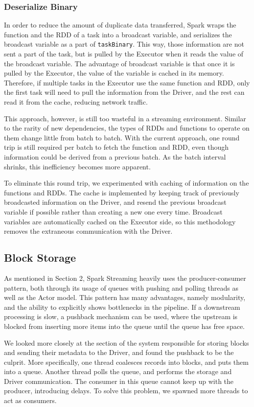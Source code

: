 \subsubsection{Deserialize Binary}
In order to reduce the amount of duplicate data transferred, Spark wraps the function and the RDD of a task into a broadcast variable, and serializes the broadcast variable as a part of \texttt{taskBinary}. This way, those information are not sent a part of the task, but is pulled by the Executor when it reads the value of the broadcast variable. The advantage of broadcast variable is that once it is pulled by the Executor, the value of the variable is cached in its memory. Therefore, if multiple tasks in the Executor use the same function and RDD, only the first task will need to pull the information from the Driver, and the rest can read it from the cache, reducing network traffic.

This approach, however, is still too wasteful in a streaming environment. Similar to the rarity of new dependencies, the types of RDDs and functions to operate on them change little from batch to batch. With the current approach, one round trip is still required per batch to fetch the function and RDD, even though information could be derived from a previous batch. As the batch interval shrinks, this inefficiency becomes more apparent.

To eliminate this round trip, we experimented with caching of information on the functions and RDDs. The cache is implemented by keeping track of previously broadcasted information on the Driver, and resend the previous broadcast variable if possible rather than creating a new one every time. Broadcast variables are automatically cached on the Executor side, so this methodology removes the extraneous communication with the Driver.

\subsection{Block Storage}
As mentioned in Section 2, Spark Streaming heavily uses the producer-consumer pattern, both through its usage of queues with pushing and polling threads as well as the Actor model. This pattern has many advantages, namely modularity, and the ability to explicitly shows bottlenecks in the pipeline. If a downstream processing is slow, a pushback mechanism can be used, where the upstream is blocked from inserting more items into the queue until the queue has free space.

We looked more closely at the section of the system responsible for storing blocks and sending their metadata to the Driver, and found the pushback to be the culprit. More specifically, one thread coalesces records into blocks, and puts them into a queue. Another thread polls the queue, and performs the storage and Driver communication. The consumer in this queue cannot keep up with the producer, introducing delays. To solve this problem, we spawned more threads to act as consumers.

